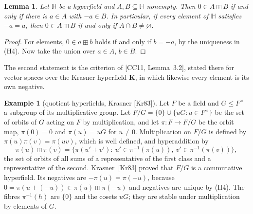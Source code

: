 \documentclass[11pt]{article}
\theoremstyle{plain}
\newtheorem{lemma}[theorem]{Lemma}
\theoremstyle{definition}
\newtheorem{example}[theorem]{Example}
\newcommand{\Hh}{\mathbb{H}}
\newcommand{\bp}{\boxplus}
\begin{document}
\begin{lemma}\label{lem:zero}
Let $\Hh$ be a hyperfield and $A,B\subseteq\Hh$ nonempty.  Then
$0\in A\bp B$ if and only if there is $a\in A$ with $-a\in B$.
In particular, if every element of $\Hh$ satisfies $-a=a$, then
$0\in A\bp B$ if and only if $A\cap B\neq\varnothing$.
\end{lemma}
\begin{proof}
For elements, $0\in a\bp b$ holds if and only if $b=-a$, by the
uniqueness in (H4).  Now take the union over $a\in A$, $b\in B$.
\end{proof}

The second statement is the criterion of [CC11, Lemma~3.2], stated
there for vector spaces over the Krasner hyperfield $\mathbf K$, in
which likewise every element is its own negative.

\begin{example}[quotient hyperfields, Krasner {[Kr83]}]\label{ex:quotient}
Let $F$ be a field and $G\leq F^\times$ a subgroup of its multiplicative
group.  Let $F/G=\{0\}\cup\{uG:u\in F^\times\}$ be the set of orbits of
$G$ acting on $F$ by multiplication, and let $\pi\colon F\to F/G$ be the
orbit map, $\pi(0)=0$ and $\pi(u)=uG$ for $u\neq0$.  Multiplication on
$F/G$ is defined by $\pi(u)\pi(v)=\pi(uv)$, which is well defined, and
hyperaddition by
\[
 \pi(u)\bp\pi(v)
 =\bigl\{\pi(u'+v'):\ u'\in\pi^{-1}(\pi(u)),\ v'\in\pi^{-1}(\pi(v))\bigr\},
\]
the set of orbits of all sums of a representative of the first class
and a representative of the second.  Krasner~[Kr83] proved that $F/G$
is a commutative hyperfield.  Its negatives are $-\pi(u)=\pi(-u)$,
because $0=\pi(u+(-u))\in\pi(u)\bp\pi(-u)$ and negatives are unique by
(H4).  The fibres $\pi^{-1}(h)$ are $\{0\}$ and the cosets $uG$; they
are stable under multiplication by elements of $G$.
\end{example}
\end{document}
